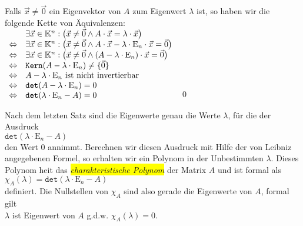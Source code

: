 \proof
Falls $\vec{x} \not= \vec{0}$ ein Eigenvektor von $A$ zum Eigenwert $\lambda$ ist, so haben wir die folgende
Kette von \"Aquivalenzen:
\\[0.2cm]
\hspace*{1.3cm}
$
\begin{array}[b]{lll}
                  & \exists \vec{x} \in \mathbb{K}^n: \bigl(\vec{x} \not=\vec{0} \wedge A \cdot \vec{x}  = \lambda \cdot \vec{x}\bigr) \\
\Leftrightarrow   & \exists \vec{x} \in \mathbb{K}^n: \bigl(\vec{x} \not=\vec{0} \wedge A \cdot \vec{x} - \lambda \cdot \mathrm{E}_n \cdot \vec{x} = \vec{0}\bigr) \\
\Leftrightarrow   & \exists \vec{x} \in \mathbb{K}^n: \bigl(\vec{x} \not=\vec{0} \wedge (A - \lambda \cdot \mathrm{E}_n) \cdot \vec{x} = \vec{0}\bigr) \\
\Leftrightarrow   & \mathtt{Kern}(A - \lambda \cdot \mathrm{E}_n) \not= \{\vec{0}\} \\
\Leftrightarrow   & \mbox{$A - \lambda \cdot \mathrm{E}_n$ ist nicht invertierbar} \\
\Leftrightarrow   & \mathtt{det}(A - \lambda \cdot \mathrm{E}_n) = 0  \\
\Leftrightarrow   & \mathtt{det}(\lambda \cdot \mathrm{E}_n - A) = 0  
\end{array}
$
\qed

Nach dem letzten Satz sind die Eigenwerte genau die Werte $\lambda$, f\"ur die der Ausdruck 
\\[0.2cm]
\hspace*{1.3cm}
 $\mathtt{det}(\lambda \cdot \mathrm{E}_n- A)$
\\[0.2cm]
den Wert $0$ annimmt.  Berechnen wir diesen Ausdruck mit Hilfe der von Leibniz angegebenen Formel,
so erhalten wir ein Polynom in der Unbestimmten $\lambda$.  Dieses Polynom hei\3t das
\colorbox{yellow}{\emph{charakteristische Polynom}} der Matrix $A$ und ist formal als
\\[0.2cm]
\hspace*{1.3cm}
$\chi_A(\lambda) = \mathtt{det}(\lambda \cdot \mathrm{E}_n - A)$
\\[0.2cm]
definiert.  Die Nullstellen von $\chi_A$ sind also gerade die Eigenwerte von $A$, formal gilt
\\[0.2cm]
\hspace*{1.3cm}
$\lambda$ ist Eigenwert von $A$ \quad g.d.w. \quad $\chi_A(\lambda) = 0$.



